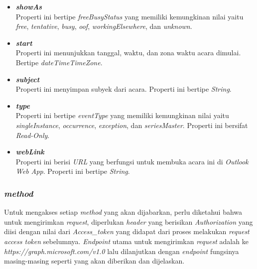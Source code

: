 \begin{itemize}
	\item \textbf{\textit{showAs}}\\
	Properti ini bertipe \textit{freeBusyStatus} yang memiliki kemungkinan nilai yaitu \textit{free}, \textit{tentative}, \textit{busy}, \textit{oof}, \textit{workingElsewhere}, dan \textit{unknown}. 
	\item \textbf{\textit{start}}\\
	Properti ini menunjukkan tanggal, waktu, dan zona waktu acara dimulai. Bertipe \textit{dateTimeTimeZone}. 
	\item \textbf{\textit{subject}}\\
	Properti ini menyimpan subyek dari acara. Properti ini bertipe \textit{String}.
	\item \textbf{\textit{type}}\\
	Properti ini bertipe \textit{eventType} yang memiliki kemungkinan nilai yaitu \textit{singleInstance}, \textit{occurrence}, \textit{exception}, dan \textit{seriesMaster}. Properti ini bersifat \textit{Read-Only}. 
	\item \textbf{\textit{webLink}}\\
	Properti ini berisi \textit{URL} yang berfungsi untuk membuka acara ini di \textit{Outlook Web App}. Properti ini bertipe \textit{String}. 
\end{itemize}

\subsubsection{\textit{method}}
Untuk mengakses setiap \textit{method} yang akan dijabarkan, perlu diketahui bahwa untuk mengirimkan \textit{request}, diperlukan \textit{header} yang berisikan \textit{Authorization} yang diisi dengan nilai dari \textit{Access\_token} yang didapat dari proses melakukan \textit{request access token} sebelumnya. \textit{Endpoint} utama untuk mengirimkan \textit{request} adalah ke \textit{https://graph.microsoft.com/v1.0} lalu dilanjutkan dengan \textit{endpoint} fungsinya masing-masing seperti yang akan diberikan dan dijelaskan. 

